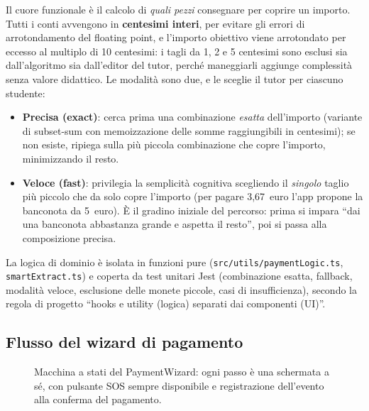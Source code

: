 \documentclass[11pt,a4paper]{article}
\begin{document}
Il cuore funzionale \`e il calcolo di \emph{quali pezzi} consegnare per coprire un importo. Tutti
i conti avvengono in \textbf{centesimi interi}, per evitare gli errori di arrotondamento del
floating point, e l'importo obiettivo viene arrotondato per eccesso al multiplo di 10 centesimi:
i tagli da 1, 2 e 5 centesimi sono esclusi sia dall'algoritmo sia dall'editor del tutor, perch\'e
maneggiarli aggiunge complessit\`a senza valore didattico. Le modalit\`a sono due, e le sceglie il
tutor per ciascuno studente:

\begin{itemize}[leftmargin=1.4cm]
  \item \textbf{Precisa (exact)}: cerca prima una combinazione \emph{esatta} dell'importo
  (variante di subset-sum con memoizzazione delle somme raggiungibili in centesimi); se non
  esiste, ripiega sulla pi\`u piccola combinazione che copre l'importo, minimizzando il resto.
  \item \textbf{Veloce (fast)}: privilegia la semplicit\`a cognitiva scegliendo il \emph{singolo}
  taglio pi\`u piccolo che da solo copre l'importo (per pagare 3{,}67~euro l'app propone la
  banconota da 5~euro). \`E il gradino iniziale del percorso: prima si impara ``dai una
  banconota abbastanza grande e aspetta il resto'', poi si passa alla composizione precisa.
\end{itemize}


La logica di dominio \`e isolata in funzioni pure (\texttt{src/utils/paymentLogic.ts},
\texttt{smartExtract.ts}) e coperta da test unitari Jest (combinazione esatta, fallback, modalit\`a
veloce, esclusione delle monete piccole, casi di insufficienza), secondo la regola di progetto
``hooks e utility (logica) separati dai componenti (UI)''.

\subsection{Flusso del wizard di pagamento}

\begin{figure}[H]
\centering
{}
\caption{Macchina a stati del PaymentWizard: ogni passo \`e una schermata a s\'e, con pulsante SOS
sempre disponibile e registrazione dell'evento alla conferma del pagamento.}
\end{figure}
\end{document}
